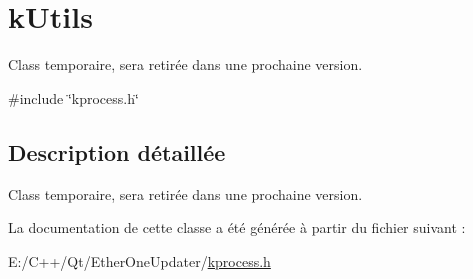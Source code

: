 \hypertarget{classkUtils}{}\section{k\+Utils}
\label{classkUtils}


Class temporaire, sera retirée dans une prochaine version.  




{\ttfamily \#include \char`\"{}kprocess.\+h\char`\"{}}



\subsection{Description détaillée}
Class temporaire, sera retirée dans une prochaine version. 

La documentation de cette classe a été générée à partir du fichier suivant \+:\begin{DoxyCompactItemize}
\item 
E\+:/\+C++/\+Qt/\+Ether\+One\+Updater/\hyperlink{kprocess_8h}{kprocess.\+h}\end{DoxyCompactItemize}
